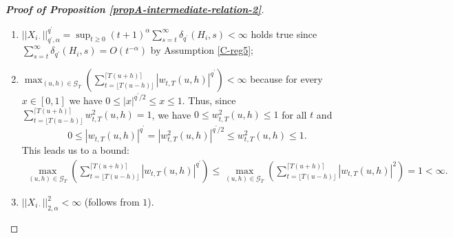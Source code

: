 \documentclass[a4paper,12pt]{article}
\begin{document}
\begin{proof}[\textnormal{\textbf{Proof of Proposition \ref{propA-intermediate-relation-2}}}]
\begin{enumerate}
	\item $||X_{i\cdot}||^{q^\prime}_{q^\prime, \alpha} = \sup_{t\geq 0} (t+1)^{\alpha} \sum_{s=t}^{\infty} \delta_{q^\prime}(H_{i}, s)  < \infty$ holds true since $\sum_{s=t}^{\infty}\delta_{q^\prime}(H_{i}, s) = O(t^{-\alpha})$ by Assumption \ref{C-reg5};
	\item $\max_{(u, h) \in \mathcal{G}_T} \left( \sum_{t=\lfloor T(u-h) \rfloor}^{\lceil T(u+h) \rceil} |w_{t,T}(u,h)|^{q^\prime}\right) < \infty$ because for every $x \in [0, 1]$ we have $ 0 \leq |x|^{q^\prime/2} \leq x \leq 1$. Thus, since $\sum_{t=\lfloor T(u-h) \rfloor}^{\lceil T(u+h) \rceil} w^2_{t,T}(u,h) = 1$, we have \linebreak $0 \leq w^2_{t,T}(u,h) \leq 1$ for all $t$ and
$$ 0 \leq |w_{t,T}(u,h)|^{q^\prime} =  |w^2_{t,T}(u,h)|^{q^\prime/2} \leq w^2_{t,T}(u,h) \leq 1.$$
This leads us to a bound:  
\begin{align*}
\max_{(u, h) \in \mathcal{G}_T} \left( \sum_{t=\lfloor T(u-h) \rfloor}^{\lceil T(u+h) \rceil} |w_{t,T}(u,h)|^{q^\prime}\right) \leq
\max_{(u, h) \in \mathcal{G}_T} \left( \sum_{t=\lfloor T(u-h) \rfloor}^{\lceil T(u+h) \rceil} |w_{t,T}(u,h)|^{2}\right) =1 < \infty.
\end{align*}
	\item $||X_{i\cdot}||^{2}_{2, \alpha} < \infty$ (follows from $1$).
\end{enumerate}



\end{proof}
\end{document}
